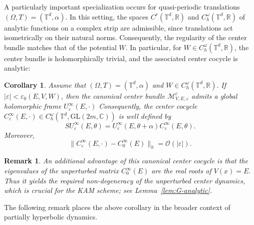 \documentclass[reqno,11pt]{amsart}
\newtheorem{remark}{Remark}[section]
\newtheorem{corollary}{Corollary}[section]
\begin{document}
A particularly important specialization occurs for quasi-periodic
translations
$(\Omega,T)=(\mathbb T^d,\alpha).$
In this setting, the spaces $C^r(\mathbb T^d,\mathbb R)$ and
$C_h^\omega(\mathbb T^d,\mathbb R)$ of analytic functions on a complex strip
are admissible, since translations act isometrically on their natural norms.
Consequently, the regularity of the center bundle matches that of the potential $W$.
In particular, for
$W\in C_h^\omega(\mathbb T^d,\mathbb R)$, the center bundle is
holomorphically trivial, and the associated center cocycle is analytic:




\begin{corollary}\label{cor:icc-torus}
Assume that
$(\Omega,T)=(\mathbb T^d,\alpha)$
and $W\in C^\omega_h(\mathbb T^d,\mathbb R).$  If $|\varepsilon|<\varepsilon_0(E,V,W)$, 
then the canonical center bundle
$\boldsymbol{\mathcal M}^c_{V,E,\varepsilon}$
admits a global holomorphic frame $
U^\infty_\varepsilon(E,\cdot)$
Consequently, the center cocycle $
C^\infty_\varepsilon(E,\cdot)\in C^\omega_h\!\left(
\mathbb T^d,\mathrm{GL}(2m,\mathbb C)\right)$
is well defined by
$$
S U^\infty_\varepsilon(E,\theta)=
U^\infty_\varepsilon(E,\theta+\alpha)C^\infty_\varepsilon(E,\theta).
$$
Moreover,
\begin{equation}\label{loc-kam}
\bigl\|
C^\infty_\varepsilon(E,\cdot)-C^\infty_0(E)\bigr\|_{h}=\mathcal O(|\varepsilon|).
\end{equation}
\end{corollary}

\begin{remark}\label{non-dege}
    An additional advantage of this canonical  center cocycle  is that the eigenvalues of the unperturbed matrix $C^\infty_0(E)$ are the real roots of $V(x)=E.$ Thus it yields the required
non-degeneracy of the unperturbed center dynamics, which is crucial for the
KAM scheme; see Lemma~\ref{lem:G-analytic}.
\end{remark}


The following remark places the above corollary in the broader context of partially hyperbolic dynamics.
\end{document}
